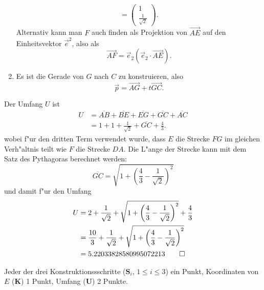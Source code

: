\begin{loesung}
\begin{teilaufgaben}
\begin{enumerate}
\[=
\begin{pmatrix}1\\\frac1{\sqrt{2}}\end{pmatrix}.
\]
Alternativ kann man $F$ auch finden als Projektion von $\overrightarrow{AE}$
auf den Einheitsvektor $\vec e^2$, also als
\[
\overrightarrow{AF} = \vec{e}_2 (\vec{e}_2\cdot \overrightarrow{AE}).
\]
\item Es ist die Gerade von $G$ nach $C$ zu konstruieren, also
\[
\vec p = \overrightarrow{AG}+t\overrightarrow{GC}.
\]
\end{enumerate}
\item
Der Umfang $U$ ist
\begin{align*}
U
&=
\overline{AB} + \overline{BE} + \overline{EG} + \overline{GC} +\overline{AC}
\\
&=
1 + 1 + \frac1{\sqrt{2}}+\overline{GC} + \frac43.
\end{align*}
wobei f"ur den dritten Term verwendet wurde, dass $E$ die Strecke
$FG$ im gleichen Verh"altnis teilt wie $F$ die Strecke $DA$.
Die L"ange der Strecke kann mit dem Satz des Pythagoras berechnet
werden:
\[
\overline{GC}
=
\sqrt{1+\left(\frac43-\frac1{\sqrt{2}}\right)^2}
\]
und damit f"ur den Umfang
\begin{align*}
U
&=
 2
+ \frac1{\sqrt{2}}
+ \sqrt{1+\left(\frac43-\frac1{\sqrt{2}}\right)^2}
+ \frac43
\\
&=
\frac{10}{3}
+ \frac1{\sqrt{2}}
+ \sqrt{1+\left(\frac43-\frac1{\sqrt{2}}\right)^2}
\\
&=
5.22033828580995072213
\qedhere
\end{align*}
\end{teilaufgaben}
\end{loesung}

\begin{bewertung}
Jeder der drei Konstruktionssschritte ($\textbf{S}_i$, $1\le i\le 3$) ein Punkt,
Koordinaten von $E$ ({\bf K}) 1 Punkt,
Umfang ({\bf U}) 2 Punkte.
\end{bewertung}

